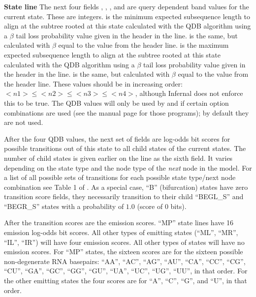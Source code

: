 \begin{sreitems}{\textbf{State line}}
  The next four fields , , , and
   are query dependent band values for the current
  state. These are integers.  is the minimum expected
  subsequence length to align at the subtree rooted at this state
  calculated with the QDB algorithm \cite{NawrockiEddy07} using a
  $\beta$ tail loss probability value given in the header in the
   line.  is the same, but calculated with
  $\beta$ equal to the value from the  header line. 
   is the maximum expected
  subsequence length to align at the subtree rooted at this state
  calculated with the QDB algorithm \cite{NawrockiEddy07} using a
  $\beta$ tail loss probability value given in the header in the
   line.  is the same, but calculated with
  $\beta$ equal to the value from the  header line. 
  These values should be in increasing order: $<n1> \leq <n2> \leq
  <n3> \leq <n4>$, although Infernal does not enforce this to be
  true. The QDB values will only be used by  and
   if certain option combinations are used (see the
  manual page for those programs); by default they are not used.

  After the four QDB values, the next set of fields are log-odds bit
  scores for possible transitions out of this state to all child
  states of the current states. The number of child states is given
  earlier on the line as the sixth field. It varies depending on the
  state type and the node type of the \emph{next} node in the model.
  For a list of all possible sets of transitions for each possible
  state type/next node combination see Table 1 of
  \cite{NawrockiEddy07}. As a special case, ``B'' (bifurcation) states
  have zero transition score fields, they necessarily transition to
  their child ``BEGL\_S'' and ``BEGR\_S'' states with a probability of
  $1.0$ (score of $0$ bits).

  After the transition scores are the emission scores. 
  ``MP'' state lines have 16 emission log-odds bit scores. All other
  types of emitting states (``ML'', ``MR'', ``IL'', ``IR'') will have
  four emission scores. All other types of states will have no
  emission scores. For ``MP'' states, the sixteen scores are for the
  sixteen possible non-degenerate RNA basepairs: ``AA'', ``AC'',
  ``AG'', ``AU'', ``CA'', ``CC'', ``CG'', ``CU'', ``GA'', ``GC'',
  ``GG'', ``GU'', ``UA'', ``UC'', ``UG'', ``UU'', in that order. 
  For the other emitting states the four scores are for ``A'', ``C'',
  ``G'', and ``U'', in that order.
\end{sreitems}

